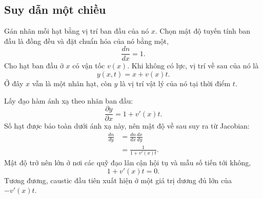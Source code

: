 \subsection{Suy dẫn một chiều}

Gán nhãn mỗi hạt bằng vị trí ban đầu của nó \(x\). Chọn mật độ tuyến tính ban đầu là đồng đều và đặt chuẩn hóa của nó bằng một,
\begin{equation}
\frac{dn}{dx}=1.
\label{eq:c09-initial-density}
\end{equation}
Cho hạt ban đầu ở \(x\) có vận tốc \(v(x)\). Khi không có lực, vị trí về sau của nó là
\begin{equation}
y(x,t)=x+v(x)t.
\label{eq:c09-ballistic-map}
\end{equation}
Ở đây \(x\) vẫn là một nhãn hạt, còn \(y\) là vị trí vật lý của nó tại thời điểm \(t\).

Lấy đạo hàm ánh xạ theo nhãn ban đầu:
\begin{equation}
\frac{\partial y}{\partial x}
=1+v'(x)t.
\label{eq:c09-jacobian}
\end{equation}
Số hạt được bảo toàn dưới ánh xạ này, nên mật độ về sau suy ra từ Jacobian:
\begin{align}
\frac{dn}{dy}
&=
\frac{dn}{dx}\frac{dx}{dy}\\
&=
\frac{1}{1+v'(x)t}.
\label{eq:c09-caustic-density}
\end{align}
Mật độ trở nên lớn ở nơi các quỹ đạo lân cận hội tụ và mẫu số tiến tới không,
\begin{equation}
1+v'(x)t=0.
\label{eq:c09-caustic-condition}
\end{equation}
Tương đương, caustic đầu tiên xuất hiện ở một giá trị dương đủ lớn của \(-v'(x)t\).

